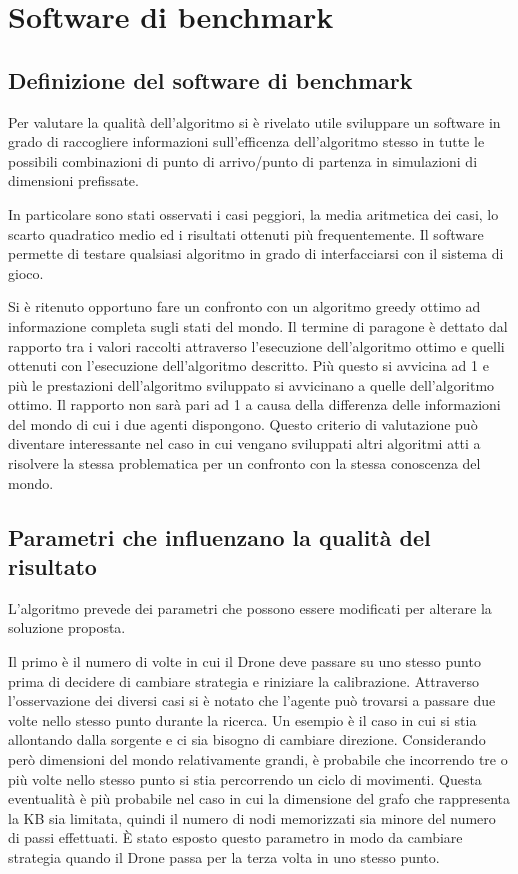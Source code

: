 \chapter{Software di benchmark}
\section{Definizione del software di benchmark}
Per valutare la qualità dell'algoritmo si è rivelato utile sviluppare un software in grado di raccogliere informazioni sull'efficenza dell'algoritmo stesso in tutte le possibili combinazioni di punto di arrivo/punto di partenza in simulazioni di dimensioni prefissate. 

In particolare sono stati osservati i casi peggiori, la media aritmetica dei casi, lo scarto quadratico medio ed i risultati ottenuti più frequentemente. Il software permette di testare qualsiasi algoritmo in grado di interfacciarsi con il sistema di gioco. 

Si è ritenuto opportuno fare un confronto con un algoritmo greedy ottimo ad informazione completa sugli stati del mondo. Il termine di paragone è dettato dal rapporto tra i valori raccolti attraverso l'esecuzione dell'algoritmo ottimo e quelli ottenuti con l'esecuzione dell'algoritmo descritto. Più questo si avvicina ad 1 e più le prestazioni dell'algoritmo sviluppato si avvicinano a quelle dell'algoritmo ottimo. 
Il rapporto non sarà pari ad 1 a causa della differenza delle informazioni del mondo di cui i due agenti dispongono. Questo criterio di valutazione può diventare interessante nel caso in cui vengano sviluppati altri algoritmi atti a risolvere la stessa problematica per un confronto con la stessa conoscenza del mondo.

\section{Parametri che influenzano la qualità del risultato}
L'algoritmo prevede dei parametri che possono essere modificati per alterare la soluzione proposta. 

Il primo è il numero di volte in cui il Drone deve passare su uno stesso punto prima di decidere di cambiare strategia e riniziare la calibrazione. Attraverso l'osservazione dei diversi casi si è notato che l'agente può trovarsi a passare due volte nello stesso punto durante la ricerca. Un esempio è il caso in cui si stia allontando dalla sorgente e ci sia bisogno di cambiare direzione. Considerando però dimensioni del mondo relativamente grandi, è probabile che incorrendo tre o più volte nello stesso punto si stia percorrendo un ciclo di movimenti. Questa eventualità è più probabile nel caso in cui la dimensione del grafo che rappresenta la KB  sia limitata, quindi il numero di nodi memorizzati sia minore del numero di passi effettuati. È stato esposto questo parametro in modo da cambiare strategia quando il Drone passa per la terza volta in uno stesso punto.

